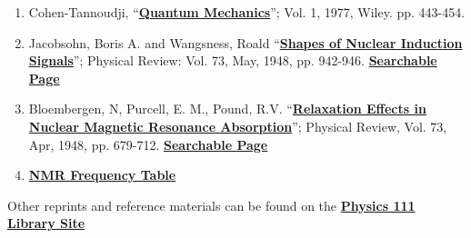 \documentclass{../lab}
\begin{document}
\begin{enumerate}
    \item Cohen-Tannoudji, ``\href{http://physics111.lib.berkeley.edu/Physics111/Reprints/NMR/09-Quantum\_Mechanics.pdf}{\textbf{Quantum Mechanics}}''; Vol. 1, 1977, Wiley. pp. 443-454.

    \item Jacobsohn, Boris A. and Wangsness, Roald ``\href{http://prola.aps.org/abstract/PR/v73/i9/p942\_1}{\textbf{Shapes of Nuclear Induction Signals}}''; Physical Review: Vol. 73, May, 1948, pp. 942-946. \href{http://physics111.lib.berkeley.edu/Physics111/Reprints/NMR/10-Shapes\_of\_Nuclear\_Induction\_Signals.pdf}{\textbf{Searchable Page}}

    \item Bloembergen, N, Purcell, E. M., Pound, R.V. ``\href{http://prola.aps.org/abstract/PR/v73/i7/p679\_1}{\textbf{Relaxation Effects in Nuclear Magnetic Resonance Absorption}}''; Physical Review, Vol. 73, Apr, 1948, pp. 679-712. \href{http://physics111.lib.berkeley.edu/Physics111/Reprints/NMR/11-Relaxation\_Effects\_in\_NMR\_Absoprtion.pdf}{\textbf{Searchable Page}}

    \item \href{http://experimentationlab.berkeley.edu/sites/default/files/images/NMR32.jpg}{\textbf{NMR Frequency Table}}

\end{enumerate}

Other reprints and reference materials can be found on the \href{http://physics111.lib.berkeley.edu/Physics111/Reprints/NMR/NMR\_index.html}{\textbf{Physics 111 Library Site}}
\end{document}
